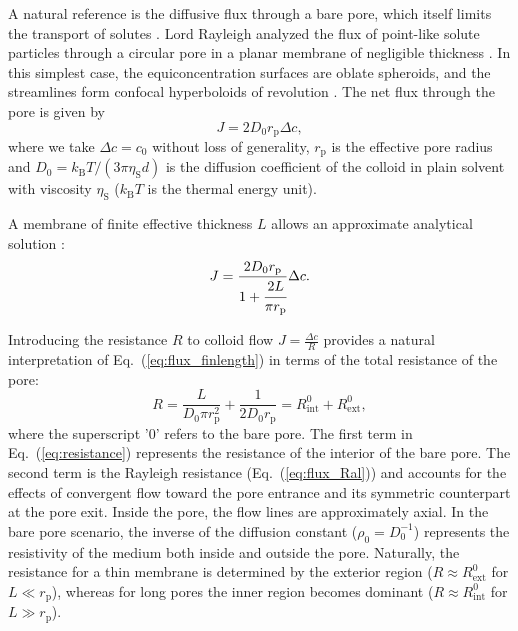 \documentclass[12pt, a4paper]{article}
\begin{document}
A natural reference is the diffusive flux through a bare pore, which itself limits the transport of solutes \cite{Deen1987, Sun2024}.
Lord Rayleigh analyzed the flux of point-like solute particles through a circular pore in a planar membrane of negligible thickness \cite{Strutt1878}.
In this simplest case, the equiconcentration surfaces are oblate spheroids, and the streamlines form confocal hyperboloids of revolution \cite{Cooke1966}.
The net flux through the pore is given by
\begin{equation}
    J=2D_0r_{\text{p}}\Delta c,
    \label{eq:flux_Ral}
\end{equation}
where we take $\Delta c = c_0$ without loss of generality, $r_{\text{p}}$ is the effective pore radius and $D_0 = k_{\text{B}}T / (3 \pi \eta_{\text{S}} d)$ is the diffusion coefficient of the colloid in plain solvent with viscosity $\eta_{\text{S}}$ ($k_{\text{B}}T$ is the thermal energy unit).

A membrane of finite effective thickness $L$ allows an approximate analytical solution \cite{Brunn1984}:
\begin{equation}
    J=\frac{2 D_0 r_{\text{p}}}{1+\cfrac{2L}{\pi r_{\text{p}}}}\Delta c.
    \label{eq:flux_finlength}
\end{equation}

Introducing the resistance $R$ to colloid flow $J = \frac{\Delta c}{R}$ provides a natural interpretation of Eq.~(\ref{eq:flux_finlength}) in terms of the total resistance of the pore:
\begin{equation}
    R = \frac{L}{D_0 \pi r_{\text{p}}^{2}} + \frac{1}{2 D_0 r_{\text{p}}} = R_{\text{int}}^{0} + R_{\text{ext}}^{0},
    \label{eq:resistance}
\end{equation}
where the superscript '0' refers to the bare pore.
The first term in Eq.~(\ref{eq:resistance}) represents the resistance of the interior of the bare pore.
The second term is the Rayleigh resistance (Eq.~(\ref{eq:flux_Ral})) and accounts for the effects of convergent flow toward the pore entrance and its symmetric counterpart at the pore exit.
Inside the pore, the flow lines are approximately axial.
In the bare pore scenario, the inverse of the diffusion constant ($\rho_0=D_0^{-1}$) represents the resistivity of the medium both inside and outside the pore.
Naturally, the resistance for a thin membrane is determined by the exterior region ($R \approx R_{\text{ext}}^{0}$ for $L \ll r_{\text{p}}$), whereas for long pores the inner region becomes dominant ($R \approx R_{\text{int}}^{0}$ for $L \gg r_{\text{p}}$).
\end{document}

